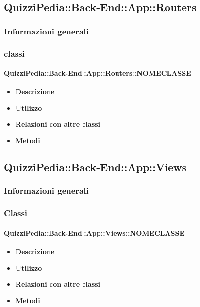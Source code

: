 \subsection{QuizziPedia::Back-End::App::Routers}
\subsubsection{Informazioni generali}
\subsubsection{classi}
\paragraph{QuizziPedia::Back-End::App::Routers::NOMECLASSE}
	\begin{itemize}
		\item \textbf{Descrizione} \\
		\item \textbf{Utilizzo} \\
		\item \textbf{Relazioni con altre classi} \\
		\item \textbf{Metodi} \\
	\end{itemize}
	
\subsection{QuizziPedia::Back-End::App::Views}
\subsubsection{Informazioni generali}
\subsubsection{Classi}
\paragraph{QuizziPedia::Back-End::App::Views::NOMECLASSE}
	\begin{itemize}
		\item \textbf{Descrizione} \\
		\item \textbf{Utilizzo} \\
		\item \textbf{Relazioni con altre classi} \\
		\item \textbf{Metodi} \\
	\end{itemize}